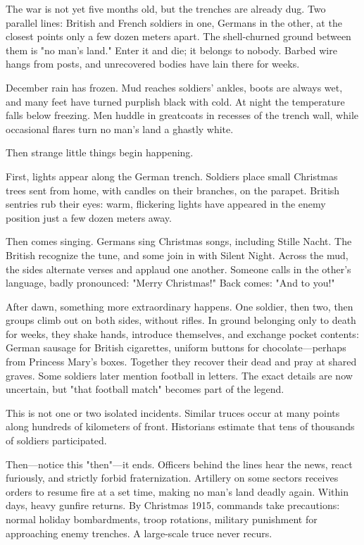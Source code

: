 The war is not yet five months old, but the trenches are already dug. Two parallel lines: British and French soldiers in one, Germans in the other, at the closest points only a few dozen meters apart. The shell-churned ground between them is "no man's land." Enter it and die; it belongs to nobody. Barbed wire hangs from posts, and unrecovered bodies have lain there for weeks.

December rain has frozen. Mud reaches soldiers' ankles, boots are always wet, and many feet have turned purplish black with cold. At night the temperature falls below freezing. Men huddle in greatcoats in recesses of the trench wall, while occasional flares turn no man's land a ghastly white.

Then strange little things begin happening.

First, lights appear along the German trench. Soldiers place small Christmas trees sent from home, with candles on their branches, on the parapet. British sentries rub their eyes: warm, flickering lights have appeared in the enemy position just a few dozen meters away.

Then comes singing. Germans sing Christmas songs, including Stille Nacht. The British recognize the tune, and some join in with Silent Night. Across the mud, the sides alternate verses and applaud one another. Someone calls in the other's language, badly pronounced: "Merry Christmas!" Back comes: "And to you!"

After dawn, something more extraordinary happens. One soldier, then two, then groups climb out on both sides, without rifles. In ground belonging only to death for weeks, they shake hands, introduce themselves, and exchange pocket contents: German sausage for British cigarettes, uniform buttons for chocolate---perhaps from Princess Mary's boxes. Together they recover their dead and pray at shared graves. Some soldiers later mention football in letters. The exact details are now uncertain, but "that football match" becomes part of the legend.

This is not one or two isolated incidents. Similar truces occur at many points along hundreds of kilometers of front. Historians estimate that tens of thousands of soldiers participated.

Then---notice this "then"---it ends. Officers behind the lines hear the news, react furiously, and strictly forbid fraternization. Artillery on some sectors receives orders to resume fire at a set time, making no man's land deadly again. Within days, heavy gunfire returns. By Christmas 1915, commands take precautions: normal holiday bombardments, troop rotations, military punishment for approaching enemy trenches. A large-scale truce never recurs.

